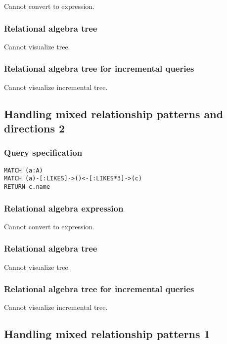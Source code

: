 Cannot convert to expression.

\subsubsection*{Relational algebra tree}

Cannot visualize tree.

\subsubsection*{Relational algebra tree for incremental queries}

Cannot visualize incremental tree.

\subsection{Handling mixed relationship patterns and directions 2}

\subsubsection*{Query specification}

\begin{lstlisting}
MATCH (a:A)
MATCH (a)-[:LIKES]->()<-[:LIKES*3]->(c)
RETURN c.name
\end{lstlisting}

\subsubsection*{Relational algebra expression}

Cannot convert to expression.

\subsubsection*{Relational algebra tree}

Cannot visualize tree.

\subsubsection*{Relational algebra tree for incremental queries}

Cannot visualize incremental tree.

\subsection{Handling mixed relationship patterns 1}

